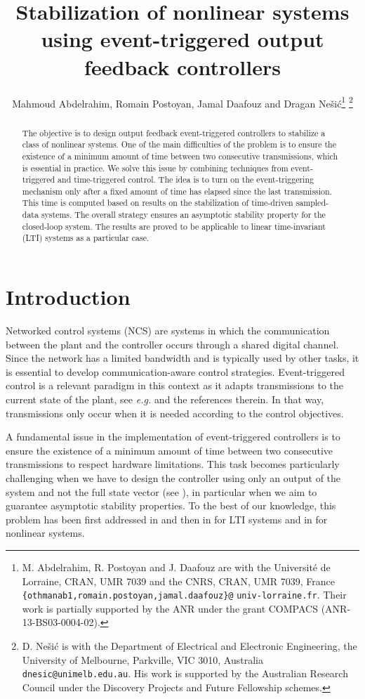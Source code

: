 \documentclass[a4paper, 9pt, twocolumn]{IEEEtran}
\title{\LARGE \bf
Stabilization of nonlinear systems using event-triggered output feedback controllers
}
\author{Mahmoud Abdelrahim, Romain Postoyan, Jamal Daafouz and Dragan Ne\v{s}i\'c\thanks{M. Abdelrahim, R. Postoyan and J. Daafouz are with the Universit\'{e} de Lorraine, CRAN, UMR 7039 and the CNRS, CRAN, UMR 7039, France {\tt\small \{othmanab1,romain.postoyan,jamal.daafouz\}@} {\tt\small univ-lorraine.fr}. Their work is partially supported by the ANR under the grant COMPACS (ANR-13-BS03-0004-02).}
\thanks{D. Ne\v{s}i\'c is with the Department of Electrical and Electronic Engineering, the University of Melbourne, Parkville, VIC 3010, Australia {\tt\small dnesic@unimelb.edu.au}. His work is supported by the Australian Research Council under the Discovery Projects and Future Fellowship schemes.}
}
\theoremstyle{plain}
\theoremstyle{definition}
\begin{document}
\maketitle

\begin{abstract}
The objective is to design output feedback event-triggered controllers to stabilize a class of nonlinear systems. One of the main difficulties of the problem is to ensure the existence of a minimum amount of time between two consecutive transmissions, which is essential in practice. We solve this issue by combining techniques from event-triggered and time-triggered control. The idea is to turn on the event-triggering mechanism only after a fixed amount of time has elapsed since the last transmission. This time is computed based on results on the stabilization of time-driven sampled-data systems. The overall strategy ensures an asymptotic stability property for the closed-loop system. The results are proved to be applicable to linear time-invariant (LTI) systems as a particular case.
\end{abstract}

\section{Introduction}
Networked control systems (NCS) are systems in which the communication between the plant and the controller occurs through a shared digital channel. Since the network has a limited bandwidth and is typically used by other tasks, it is essential to develop communication-aware control strategies. Event-triggered control is a relevant paradigm in this context as it adapts transmissions to the current state of the plant, see \textit{e.g.} \cite{Arzen1999simple, Astrom2002comparison, Tabuada2007event, Romain2011unifying, Heemels2012Introduction} and the references therein. In that way, transmissions only occur when it is needed according to the control objectives.

A fundamental issue in the implementation of event-triggered controllers is to ensure the existence of a minimum amount of time between two consecutive transmissions to respect hardware limitations. This task becomes particularly challenging when we have to design the controller using only an output of the system and not the full state vector (see \cite{Donkers2012output}), in particular when we aim to guarantee asymptotic stability properties. To the best of our knowledge, this problem has been first addressed in \cite{Kofman2006level} and then in \cite{Donkers2012output,Lehmann2011event, Peng2013output,Tallapragada2012event-CDC,Forni2014event,Zhang2013event,Meng2014event} for LTI systems and in \cite{Yu2012event} for nonlinear systems.
\end{document}
